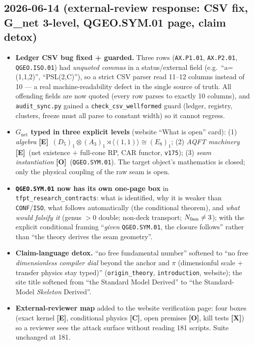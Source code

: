 \documentclass[11pt]{article}
\providecommand{\mE}{\textbf{[E]}}\providecommand{\mC}{\textbf{[C]}}
\providecommand{\mO}{\textbf{[O]}}\providecommand{\mX}{\textbf{[X]}}
\providecommand{\vref}[1]{\texttt{#1}}
\begin{document}
\subsection*{2026-06-14 (external-review response: CSV fix, G\_net 3-level, QGEO.SYM.01 page, claim detox)}
\begin{itemize}
\item \textbf{Ledger CSV bug fixed + guarded.} Three rows (\texttt{AX.P1.01}, \texttt{AX.P2.01},
  \texttt{QGEO.ISO.01}) had \emph{unquoted commas} in a status/external field (e.g.\ ``a=(1,1,2)'',
  ``PSL(2,C)''), so a strict CSV parser read 11--12 columns instead of 10 --- a real
  machine-readability defect in the single source of truth. All offending fields are now quoted (every
  row parses to exactly 10 columns), and \texttt{audit\_sync.py} gained a \texttt{check\_csv\_wellformed}
  guard (ledger, registry, clusters, freeze must all parse to constant width) so it cannot regress.
\item \textbf{$G_{\mathrm{net}}$ typed in three explicit levels} (website ``What is open'' card): (1)
  \emph{algebra} \mE\ $(D_5)_1{\otimes}(A_3)_1{\rtimes}\langle(1,1)\rangle\cong(E_8)_1$; (2) \emph{AQFT
  machinery} \mE\ (net existence $+$ full-cone RP, CAR functor, \vref{v175}); (3) \emph{seam
  instantiation} \mO\ (\texttt{QGEO.SYM.01}). The target object's mathematics is closed; only the
  physical coupling of the raw seam is open.
\item \textbf{\texttt{QGEO.SYM.01} now has its own one-page box} in \texttt{tfpt\_research\_contracts}:
  what is identified, why it is weaker than \texttt{CONF}/\texttt{ISO}, what follows automatically (the
  conditional theorem), and \emph{what would falsify it} (genus $>0$ double; non-deck transport;
  $N_{\mathrm{fam}}\neq3$); with the explicit conditional framing ``\emph{given} \texttt{QGEO.SYM.01}, the closure
  follows'' rather than ``the theory derives the seam geometry''.
\item \textbf{Claim-language detox.} ``no free fundamental number'' softened to ``no free
  \emph{dimensionless compiler dial} beyond the anchor and $\pi$ (dimensionful scale $+$ transfer
  physics stay typed)'' (\texttt{origin\_theory}, \texttt{introduction}, website); the site title
  softened from ``the Standard Model Derived'' to ``the Standard-Model \emph{Skeleton} Derived''.
\item \textbf{External-reviewer map} added to the website verification page: four boxes (exact kernel
  \mE, conditional physics \mC, open premises \mO, kill tests \mX) so a reviewer sees the attack
  surface without reading 181 scripts. Suite unchanged at 181.
\end{itemize}
\end{document}
